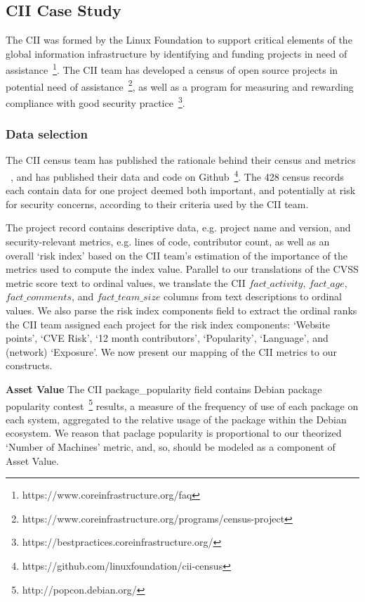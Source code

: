 \subsection{CII Case Study}
The CII was formed by the Linux Foundation to support critical elements of the global information infrastructure by identifying and funding projects in need of assistance~\footnote{https://www.coreinfrastructure.org/faq}. The CII team has developed a census of open source projects in potential need of assistance~\footnote{https://www.coreinfrastructure.org/programs/census-project}, as well as a program for measuring and rewarding compliance with good security practice~\footnote{https://bestpractices.coreinfrastructure.org/}.

\subsubsection{Data selection}
\label{sec:cii_selection}
The CII census team has published the rationale behind their census and metrics ~\cite{wheeler2015open}, and has published their data and code on Github~\footnote{https://github.com/linuxfoundation/cii-census}. The 428 census records each contain data for one project deemed both important, and potentially at risk for security concerns, according to their criteria used by the CII team.

The project record contains descriptive data, e.g. project name and version, and security-relevant metrics, e.g. lines of code, contributor count, as well as an overall `risk index' based on the CII team's estimation of the importance of the metrics used to compute the index value.  Parallel to our translations of the CVSS metric score text to ordinal values, we translate the CII $fact\_activity$, $fact\_age$, $fact\_comments$, and $fact\_team\_size$ columns from text descriptions to ordinal values. We also parse the risk index components field to extract the ordinal ranks the CII team assigned each project for the risk index components: `Website points', `CVE Risk', `12 month contributors', `Popularity', `Language', and (network) `Exposure'. We now present our mapping of the CII metrics to our constructs.

\textbf{Asset Value}
The CII package\_popularity field contains Debian package popularity contest~\footnote{http://popcon.debian.org/} results, a measure of the frequency of use of each package on each system, aggregated to the relative usage of the package within the Debian ecosystem. We reason that paclage popularity is proportional to our theorized `Number of Machines'  metric, and, so, should be modeled as a component of Asset Value.

